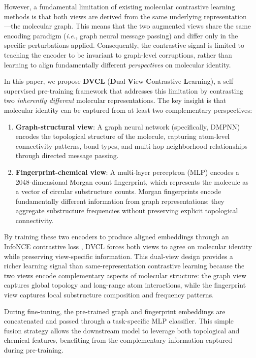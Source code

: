 \documentclass[a4paper,fleqn]{cas-sc}
\newcommand{\ie}{\textit{i.e.}}
\begin{document}
However, a fundamental limitation of existing molecular contrastive learning methods is that both views are derived from the same underlying representation---the molecular graph. This means that the two augmented views share the same encoding paradigm (\ie, graph neural message passing) and differ only in the specific perturbations applied. Consequently, the contrastive signal is limited to teaching the encoder to be invariant to graph-level corruptions, rather than learning to align fundamentally different \emph{perspectives} on molecular identity.

In this paper, we propose \textbf{DVCL} (\textbf{D}ual-\textbf{V}iew \textbf{C}ontrastive \textbf{L}earning), a self-supervised pre-training framework that addresses this limitation by contrasting two \emph{inherently different} molecular representations. The key insight is that molecular identity can be captured from at least two complementary perspectives:

\begin{enumerate}
\item \textbf{Graph-structural view}: A graph neural network (specifically, DMPNN) encodes the topological structure of the molecule, capturing atom-level connectivity patterns, bond types, and multi-hop neighborhood relationships through directed message passing.

\item \textbf{Fingerprint-chemical view}: A multi-layer perceptron (MLP) encodes a 2048-dimensional Morgan count fingerprint, which represents the molecule as a vector of circular substructure counts. Morgan fingerprints encode fundamentally different information from graph representations: they aggregate substructure frequencies without preserving explicit topological connectivity.
\end{enumerate}

By training these two encoders to produce aligned embeddings through an InfoNCE contrastive loss \citep{oord2018representation}, DVCL forces both views to agree on molecular identity while preserving view-specific information. This dual-view design provides a richer learning signal than same-representation contrastive learning because the two views encode complementary aspects of molecular structure: the graph view captures global topology and long-range atom interactions, while the fingerprint view captures local substructure composition and frequency patterns.

During fine-tuning, the pre-trained graph and fingerprint embeddings are concatenated and passed through a task-specific MLP classifier. This simple fusion strategy allows the downstream model to leverage both topological and chemical features, benefiting from the complementary information captured during pre-training.
\end{document}
